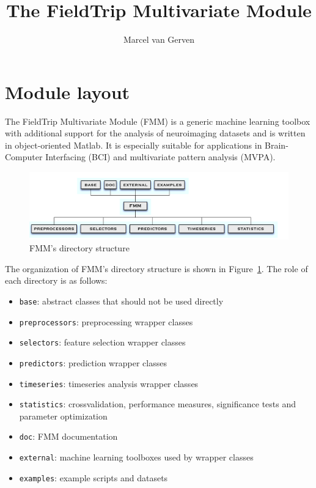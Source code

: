 \documentclass{article}
\title{The FieldTrip Multivariate Module}
\author{Marcel van Gerven}
\renewcommand{\t}[1]{{\tt #1}}
\begin{document}
\maketitle
\thispagestyle{empty}

\newpage

\tableofcontents

\newpage

\section{Module layout}

The FieldTrip Multivariate Module (FMM) is a generic machine learning toolbox with additional support for the analysis of neuroimaging datasets and is written in object-oriented Matlab. It is especially suitable for applications in Brain-Computer Interfacing (BCI) and multivariate pattern analysis (MVPA).

\begin{figure}[ht]
\begin{center}
\includegraphics[width=\textwidth]{figures/organization.pdf}
\caption{FMM's directory structure}
\end{center}
\label{dir}
\end{figure}

The organization of FMM's directory structure is shown in Figure~\ref{dir}. The role of each directory is as follows:
\begin{itemize}
\item \t{base}: abstract classes that should not be used directly 
\item \t{preprocessors}: preprocessing wrapper classes
\item \t{selectors}: feature selection wrapper classes
\item \t{predictors}: prediction wrapper classes
\item \t{timeseries}: timeseries analysis wrapper classes
\item \t{statistics}: crossvalidation, performance measures, significance tests and parameter optimization
\item \t{doc}: FMM documentation
\item \t{external}: machine learning toolboxes used by wrapper classes
\item \t{examples}: example scripts and datasets
\end{itemize}
\end{document}
